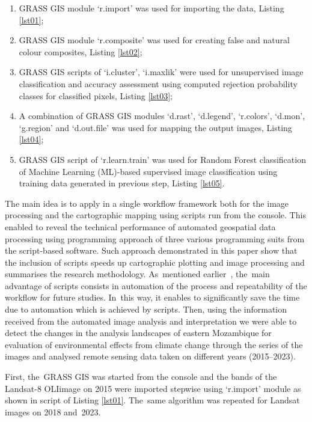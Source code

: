 \documentclass[coasts,article,accept,pdftex,oneauthor]{Definitions/mdpi}
\begin{document}
 \begin{enumerate}
        \item GRASS GIS module `r.import' was used for importing the data, Listing \ref{lst01}; 
        \item GRASS GIS module `r.composite' was used for creating false and natural colour composites, Listing \ref{lst02}; 
        \item GRASS GIS scripts of `i.cluster', `i.maxlik'  were used for unsupervised image classification and accuracy assessment using computed rejection probability classes for classified pixels, Listing \ref{lst03};  
         \item A combination of GRASS GIS modules `d.rast', `d.legend', `r.colors', `d.mon', `g.region' and `d.out.file' was used for mapping the output images, Listing \ref{lst04}; 
        \item GRASS GIS script of `r.learn.train' was used for Random Forest classification of Machine Learning (ML)-based supervised image classification using training data generated in previous step, Listing \ref{lst05}. 
  \end{enumerate}
  
The main idea is to apply in a single workflow framework both for the image processing and the cartographic mapping using scripts run from the console. This enabled to reveal the technical performance of automated geospatial data processing using programming approach of three various programming suits from the script-based software. Such approach demonstrated in this paper show that the inclusion of scripts speeds up cartographic plotting and image processing and summarises the research methodology. As~mentioned earlier~\cite{Lemenkova202215}, the~main advantage of scripts consists in automation of the process and repeatability of the workflow for future studies. In~this way, it enables to significantly save the time due to automation which is achieved by scripts. Then, using the information received from the automated image analysis and interpretation we were able to detect the changes in the analysis landscapes of eastern Mozambique for evaluation of environmental effects from climate change through the series of the images and analysed remote sensing data taken on different years (2015--2023). 

First, the~GRASS GIS was started from the console and the bands of the Landsat-8 OLIimage on 2015 were imported stepwise using `r.import' module as shown in script of Listing \ref{lst01}. The~same algorithm was repeated for Landsat images on 2018 and~2023.
\end{document}
